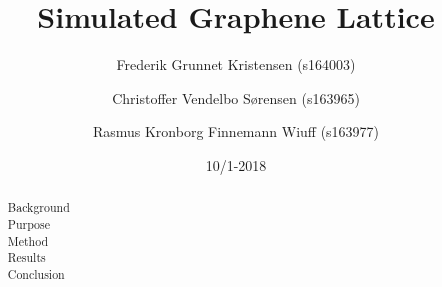 



\begin{abstract}
  \begin{description}
    \item[Background]
    \item[Purpose]
    \item[Method]
    \item[Results]
    \item[Conclusion]
  \end{description}
\end{abstract}

\title{Simulated Graphene Lattice}
\date{10/1-2018}
\author{Frederik Grunnet Kristensen (s164003)}
\author{Christoffer Vendelbo Sørensen (s163965)}
\author{Rasmus Kronborg Finnemann Wiuff (s163977)}

\maketitle


\tableofcontents
\thispagestyle{empty}
\newpage
\setcounter{page}{1}


\newpage




\newpage
\listoffigures
\listoftables
\newpage


